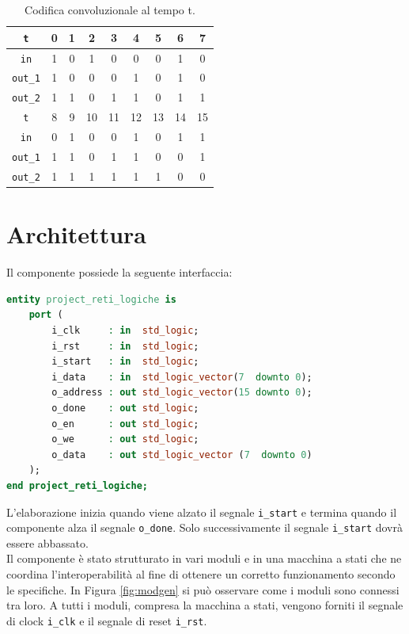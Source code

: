 \documentclass[fleqn,11pt]{article}
\begin{document}
\begin{table}[h]
    \centering
    \begin{tabular}{|c|c c c c c c c c|}
        \hline
        \verb|t| & 0 & 1 & 2 & 3 & 4 & 5 & 6 & 7 \\
        \hline
        \verb|in| & 1 & 0 & 1 & 0 & 0 & 0 & 1 & 0 \\
        \verb|out_1| & 1 & 0 & 0 & 0 & 1 & 0 & 1 & 0 \\
        \verb|out_2| & 1 & 1 & 0 & 1 & 1 & 0 & 1 & 1 \\
        \hline
        \hline
        \verb|t| & 8 & 9 & 10 & 11 & 12 & 13 & 14 & 15 \\
        \hline
        \verb|in| & 0 & 1 & 0 & 0 & 1 & 0 & 1 & 1 \\
        \verb|out_1| & 1 & 1 & 0 & 1 & 1 & 0 & 0 & 1 \\
        \verb|out_2| & 1 & 1 & 1 & 1 & 1 & 1 & 0 & 0 \\
        \hline
    \end{tabular}
    \caption{Codifica convoluzionale al tempo t.}
    \label{tab:conv}
\end{table}

\section{Architettura}
Il componente possiede la seguente interfaccia:
\begin{lstlisting}[language=VHDL]
entity project_reti_logiche is
    port (
        i_clk     : in  std_logic;
        i_rst     : in  std_logic;
        i_start   : in  std_logic;
        i_data    : in  std_logic_vector(7  downto 0);
        o_address : out std_logic_vector(15 downto 0);
        o_done    : out std_logic;
        o_en      : out std_logic;
        o_we      : out std_logic;
        o_data    : out std_logic_vector (7  downto 0)
    );
end project_reti_logiche;
\end{lstlisting}
L'elaborazione inizia quando viene alzato il segnale \verb|i_start| e termina quando il componente alza il segnale \verb|o_done|. Solo successivamente il segnale \verb|i_start| dovrà essere abbassato.\\
Il componente è stato strutturato in vari moduli e in una macchina a stati che ne coordina l'interoperabilità al fine di ottenere un corretto funzionamento secondo le specifiche.
In Figura \ref{fig:modgen} si può osservare come i moduli sono connessi tra loro. A tutti i moduli, compresa la macchina a stati, vengono forniti il segnale di clock \verb|i_clk| e il segnale di reset \verb|i_rst|.
\end{document}
